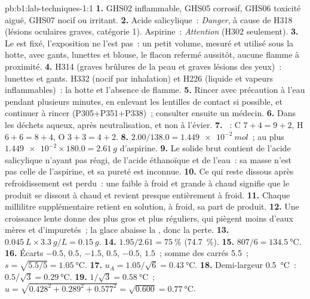 \begin{solution}{pb:b1:lab-techniques-1:1}
\textbf{1.} GHS02 inflammable, GHS05 corrosif, GHS06 toxicité aiguë,
GHS07
nocif ou irritant.
\textbf{2.} Acide salicylique~: \emph{Danger}, à cause de H318 (lésions
oculaires graves, catégorie 1). Aspirine~: \emph{Attention} (H302
seulement).
\textbf{3.} Le  est fixé, l'exposition ne l'est pas~: un petit
volume, mesuré et utilisé sous la hotte, avec gants, lunettes et blouse,
le flacon refermé aussitôt, aucune flamme à proximité.
\textbf{4.} H314 (graves brûlures de la peau et graves lésions des
yeux)~: lunettes et gants.
H332 (nocif par inhalation) et H226 (liquide et vapeurs inflammables)~:
la hotte et l'absence de flamme.
\textbf{5.} Rincer avec précaution à l'eau pendant plusieurs minutes, en
enlevant les lentilles de contact si possible, et continuer à rincer
(P305+P351+P338)~; consulter ensuite un médecin.
\textbf{6.} Dans les déchets aqueux, après neutralisation, et non à
l'évier.
\textbf{7.} ~: C $7 + 4 = 9 + 2$,
H $6 + 6 = 8 + 4$, O $3 + 3 = 4 + 2$.
\textbf{8.} $2.00/138.0 = \qty{1.449e-2}{mol}$~; au plus
$\num{1.449e-2} \times 180.0 = \qty{2.61}{g}$ d'aspirine.
\textbf{9.} Le solide brut contient de l'acide salicylique n'ayant pas
réagi, de l'acide éthanoïque et de l'eau~: sa masse n'est pas celle de
l'aspirine, et sa pureté est inconnue.
\textbf{10.} Ce qui reste dissous après refroidissement est perdu~: une
 faible à froid et grande à chaud signifie que le produit se
dissout à chaud et revient presque entièrement à froid.
\textbf{11.} Chaque millilitre supplémentaire retient en solution, à
froid, sa part de produit.
\textbf{12.} Une croissance lente donne des  plus gros et plus
réguliers, qui piègent moins d'eaux mères et d'impuretés~; la glace
abaisse la , donc la perte.
\textbf{13.} $\qty{0.045}{L} \times \qty{3.3}{g/L} = \qty{0.15}{g}$.
\textbf{14.} $1.95/2.61 = \qty{75}{\percent}$ (\qty{74.7}{\percent}).
\textbf{15.} $807/6 = \qty{134.5}{\celsius}$.
\textbf{16.} Écarts $-0.5$, $0.5$, $-1.5$, $0.5$, $-0.5$, $1.5$~; somme
des carrés 5.5~; $s = \sqrt{5.5/5} = \qty{1.05}{\celsius}$.
\textbf{17.} $u_A = 1.05/\sqrt6 = \qty{0.43}{\celsius}$.
\textbf{18.} Demi-largeur \qty{0.5}{\celsius}~: $0.5/\sqrt3 = \qty{0.29}{\celsius}$.
\textbf{19.} $1/\sqrt3 = \qty{0.58}{\celsius}$~;
$u = \sqrt{0.428^2 + 0.289^2 + 0.577^2} = \sqrt{0.600} = \qty{0.77}{\celsius}$.

\end{solution}
